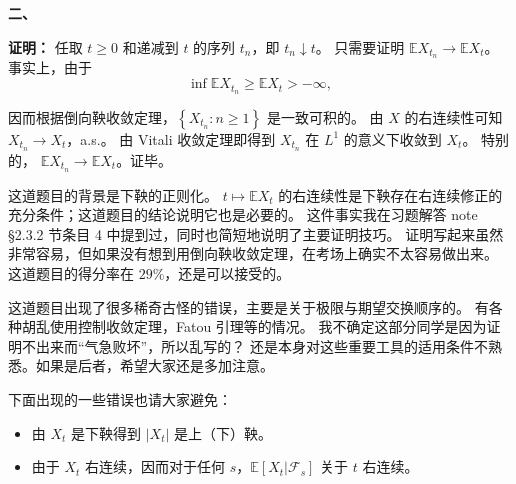     \textbf{二、}
    
    \textbf{证明：}
    任取 $t \geq 0$ 和递减到 $t$ 的序列 $t_{n}$，即 $t_{n} \downarrow t$。
    只需要证明 $\mathbb{E} X_{t_{n}} \rightarrow \mathbb{E} X_{t}$。事实上，由于
    $$\inf \mathbb{E} X_{t_{n}} \geq \mathbb{E} X_{t}>-\infty,$$

    因而根据倒向鞅收敛定理，$\left\{X_{t_{n}}: n \geq 1\right\}$ 是一致可积的。
    由 $X$ 的右连续性可知 $X_{t_{n}} \rightarrow X_{t}$，a.s.。
    由 Vitali 收敛定理即得到 $X_{t_{n}}$ 在 $L^{1}$ 的意义下收敛到 $X_{t}$。
    特别的， $\mathbb{E} X_{t_{n}} \rightarrow \mathbb{E} X_{t}$。证毕。

    \textcolor{0000cc}{\qquad 这道题目的背景是下鞅的正则化。
    $t \mapsto \mathbb{E} X_{t}$ 的右连续性是下鞅存在右连续修正的充分条件；这道题目的结论说明它也是必要的。
    这件事实我在习题解答 note §2.3.2 节条目 4 中提到过，同时也简短地说明了主要证明技巧。
    证明写起来虽然非常容易，但如果没有想到用倒向鞅收敛定理，在考场上确实不太容易做出来。
    这道题目的得分率在 $29 \%$，还是可以接受的。

    \qquad 这道题目出现了很多稀奇古怪的错误，主要是关于极限与期望交换顺序的。
    有各种胡乱使用控制收敛定理，Fatou 引理等的情况。
    我不确定这部分同学是因为证明不出来而``气急败坏''，所以乱写的？
    还是本身对这些重要工具的适用条件不熟悉。如果是后者，希望大家还是多加注意。

    \qquad 下面出现的一些错误也请大家避免：
    \begin{itemize}
    \item 由 $X_{t}$ 是下鞅得到 $\left|X_{t}\right|$ 是上（下）鞅。

    \item 由于 $X_{t}$ 右连续，因而对于任何 $s$，$\mathbb{E}[X_{t} | \mathscr{F}_{s}]$ 关于 $t$ 右连续。
    \end{itemize}}

